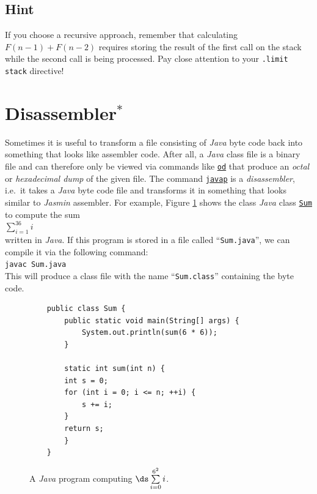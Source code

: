 \subsection*{Hint}
If you choose a recursive approach, remember that calculating $F(n-1) + F(n-2)$ requires storing the result of the first call on the stack while the second call is being processed. Pay close attention to your \texttt{.limit stack} directive!

\section{Disassembler$^*$}
Sometimes it is useful to transform a file consisting of \textsl{Java} byte code back into something
that looks like assembler code.  After all, a \textsl{Java} class file is a binary file and can
therefore only be viewed via commands like \href{http://en.wikipedia.org/wiki/Od_(Unix)}{\texttt{od}} 
that produce an \emph{octal} or \emph{hexadecimal dump} of the given file.  The command
\href{http://docs.oracle.com/javase/7/docs/technotes/tools/windows/javap.html}{\texttt{javap}} 
is a \emph{disassembler},  i.e.~it takes a \textsl{Java} byte code file and transforms it in
something that looks similar to \textsl{Jasmin} assembler.  For example, Figure \ref{fig:Sum.java}
shows the class \textsl{Java} class
\href{https://github.com/karlstroetmann/Formal-Languages/tree/master/Python/Chapter-12/Sum.java}{\texttt{Sum}}
 to compute the sum 
\\[0.2cm]
\hspace*{1.3cm}
$\sum\limits_{i=1}^{36} i$
\\[0.2cm]
written in \textsl{Java}.  If this program is
stored in a file called ``\texttt{Sum.java}'', we can compile it via the following command:
\\[0.2cm]
\hspace*{1.3cm}
\texttt{javac Sum.java}
\\[0.2cm]
This will produce a class file with the name ``\texttt{Sum.class}'' containing the byte code.

\begin{figure}[!ht]
\centering
  \begin{verbatim}
    public class Sum {
        public static void main(String[] args) {
            System.out.println(sum(6 * 6));
        }
    
        static int sum(int n) {
    	int s = 0;
    	for (int i = 0; i <= n; ++i) {
    	    s += i;
    	}
    	return s;
        }
    }
\end{verbatim}
\vspace*{-0.3cm}
\caption{A \textsl{Java} program computing $\ds\sum\limits_{i=0}^{6^2} i$.}
\label{fig:Sum.java}
\end{figure}

